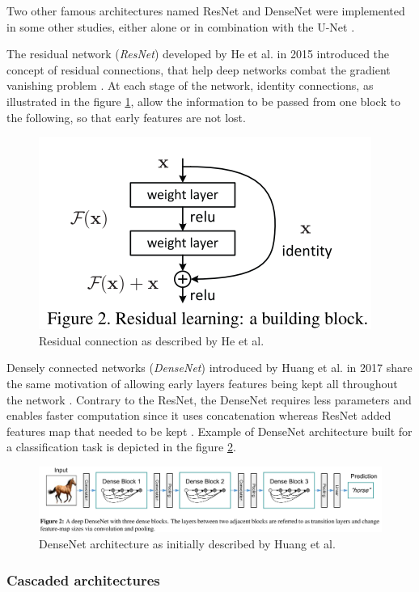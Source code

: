 \documentclass[]{article}
\begin{document}
	Two other famous architectures named ResNet and DenseNet were
	implemented in some other studies, either alone or in combination with
	the U-Net \cite{Han2017, Chlebus2018, Bi2017, Kaluva2018, Li2018}.
	
	The residual network (\emph{ResNet}) developed by He et al. in
	2015 introduced the concept of residual connections, that help deep
	networks combat the gradient vanishing problem \cite{He2015}. At each stage of the
	network, identity connections, as illustrated in the figure \ref{ResidualConnection_Fig}, allow the
	information to be passed from one block to the following, so that early
	features are not lost.
	
	\begin{figure}[th!]
		\centering
		\includegraphics[width=0.4\linewidth]{images/image6}
		\caption{Residual connection as described by He et al. \cite{He2015}}
		\label{ResidualConnection_Fig}
	\end{figure}
	
	Densely connected networks (\emph{DenseNet}) introduced by Huang
	et al. in 2017 share the same motivation of allowing early layers
	features being kept all throughout the network \cite{Huang2017}. Contrary to the ResNet,
	the DenseNet requires less parameters and enables faster computation
	since it uses concatenation whereas ResNet added features map that
	needed to be kept \cite{Huang2017}. Example of DenseNet
	architecture built for a classification task is depicted in the figure \ref{DenseNet_Fig}.
	\begin{figure}[th!]
		\centering
		\includegraphics[width=0.7\linewidth]{images/image32}
		\caption{DenseNet architecture as initially described by Huang et al. \cite{Huang2017}}
		\label{DenseNet_Fig}
	\end{figure}
	
	
	\subsubsection*{Cascaded architectures}
	
\end{document}
